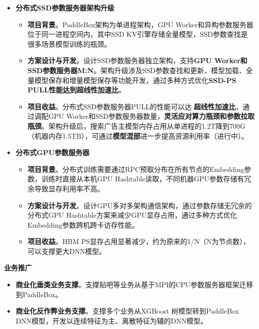 \documentclass{resume}
\begin{document}
\begin{onehalfspacing}
\begin{itemize}
\item \textbf{分布式SSD参数服务器架构升级}
\begin{itemize}
\item \textbf{项目背景}。PaddleBox架构为单进程架构，GPU Worker和异构参数服务器位于同一进程空间内，其中SSD KV引擎存储全量模型，SSD参数查找是很多场景模型训练的瓶颈。%
\item \textbf{方案设计与开发}。设计SSD参数服务器独立架构，支持\textbf{GPU Worker和SSD参数服务器M:N}。架构升级涉及SSD参数查找和更新、模型加载、全量模型保存和增量模型保存等功能开发，通过多种方式优化\textbf{SSD-PS PULL性能达到超线性加速比}。%
\item \textbf{项目收益}。分布式SSD参数服务器PULL的性能可以达 \textbf{超线性加速比}，通过调配GPU Worker和SSD参数服务器数量，\textbf{灵活应对算力瓶颈和参数拉取瓶颈}。架构升级后，搜索广告主模型内存占用从单进程的1.2T降到700G（机器内存1.5TB），可通过\textbf{模型混部}进一步提高资源利用率（进行中）。%
\end{itemize}

\item \textbf{分布式GPU参数服务器}
\begin{itemize}
\item \textbf{项目背景}。分布式训练需要通过RPC预取分布在所有节点的Embedding参数，训练时直接从本机GPU Hashtable读取，不同机器GPU参数存储有冗余导致显存利用率不高。
\item \textbf{方案设计与开发}。设计GPU多对多架构通信架构，通过参数存储无冗余的分布式GPU Hashtable方案来减少GPU显存占用，通过多种方式优化Embedding参数跨机跨卡访存性能。
\item \textbf{项目收益}。HBM PS显存占用显著减少，约为原来的1/N（N为节点数），可以支撑更大DNN模型。
\end{itemize}

\end{itemize}

\textbf{业务推广} 
\begin{itemize}%
 \item \textbf{商业化垂类业务支撑}。支撑贴吧等业务从基于MPI的CPU参数服务器框架迁移到PaddleBox。
 \item \textbf{商业化反作弊业务支撑}。支撑多个业务从XGBoost 树模型转到PaddleBox DNN模型，开发以连续特征为主、离散特征为辅的DNN模型。
\end{itemize}

\end{onehalfspacing}
\end{document}
